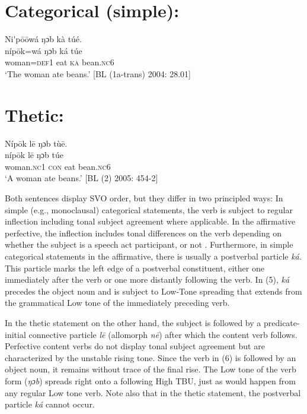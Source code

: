 \documentclass[output=paper]{langsci/langscibook}
\begin{document}
\chapter[ Categorical (simple): ]{ Categorical (simple): }
\gll Ni\'{ }p\={o}\={o}wá  ŋɔb  kà  túé.\\
\gll \textup{níp\={o}k=wá  }\textup{ŋɔb  k}\textup{á}\textup{  túe}\\
     woman=\textsc{def}1  eat  \textsc{ka}  bean.\textsc{nc}6\\
\glt ‘The woman ate beans.’ [BL (1a-trans) 2004: 28.01]
\z

\chapter[ Thetic:]{ Thetic:}
\gll Níp\={o}k    l\={e}  ŋɔb  tù\={e}.\\
\gll \textup{níp\={o}k    l\={e}  }\textup{ŋɔb  túe}\\
     woman.\textsc{nc}1  \textsc{con}  eat  bean.\textsc{nc}6\\
\glt ‘A woman ate beans.’ [BL (2) 2005: 454-2]
\z

Both sentences display SVO order, but they differ in two principled ways: In simple (e.g., monoclausal) categorical statements, the verb is subject to regular inflection including tonal subject agreement where applicable. In the affirmative perfective, the inflection includes tonal differences on the verb depending on whether the subject is a speech act participant, or not \citep{Schwarz2007}. Furthermore, in simple categorical statements in the affirmative, there is usually a postverbal particle \textit{ká. }This particle marks the left edge of a postverbal constituent, either one immediately after the verb or one more distantly following the verb. In (5), \textit{ká }precedes the object noun and is subject to Low-Tone spreading that extends from the grammatical Low tone of the immediately preceding verb.

In the thetic statement on the other hand, the subject is followed by a predicate-initial connective particle \textit{l}\textit{\={e}}\textit{ }(allomorph \textit{n\={e}}) after which the content verb follows. Perfective content verbs do not display tonal subject agreement but are characterized by the unstable rising tone. Since the verb in (6) is followed by an object noun, it remains without trace of the final rise. The Low tone of the verb form (\textit{ŋɔb}) spreads right onto a following High TBU, just as would happen from any regular Low tone verb. Note also that in the thetic statement, the postverbal particle \textit{ká }cannot occur.
\end{document}
